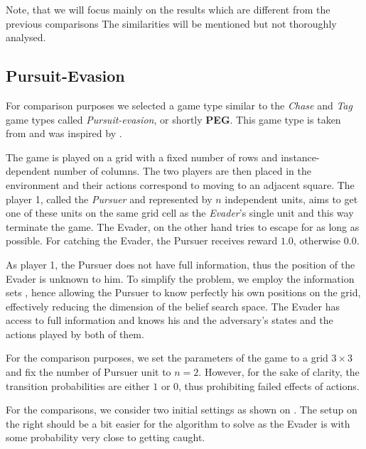 \documentclass[../main.tex]{subfiles}
\begin{document}
Note, that we will focus mainly on the results which are different from the previous comparisons
The similarities will be mentioned but not thoroughly analysed.

\subsection{Pursuit-Evasion}\label{exp:osposg:type}
For comparison purposes we selected a game type similar to the \textit{Chase} and \textit{Tag} game types called \textit{Pursuit-evasion}, or shortly \textbf{PEG}.
This game type is taken from \cite{poposgsthesis} and was inspired by \cite{peg1}.

The game is played on a grid with a fixed number of rows and instance-dependent number of columns.
The two players are then placed in the environment and their actions correspond to moving to an adjacent square.
The player 1, called the \textit{Pursuer} and represented by $n$ independent units, aims to get one of these units on the same grid cell as the \textit{Evader}'s single unit and this way terminate the game.
The Evader, on the other hand tries to escape for as long as possible.
For catching the Evader, the Pursuer receives reward $1.0$, otherwise $0.0$.

As player 1, the Pursuer does not have full information, thus the position of the Evader is unknown to him.
To simplify the problem, we employ the information sets , hence allowing the Pursuer to know perfectly his own positions on the grid, effectively reducing the dimension of the belief search space.
The Evader has access to full information and knows his and the adversary's states and the actions played by both of them.

For the comparison purposes, we set the parameters of the game to a grid $3 \times 3$ and fix the number of Pursuer unit to $n = 2$.
However, for the sake of clarity, the transition probabilities are either $1$ or $0$, thus prohibiting failed effects of actions.

For the comparisons, we consider two initial settings as shown on .
The setup on the right should be a bit easier for the algorithm to solve as the Evader is with some probability very close to getting caught.
\end{document}
